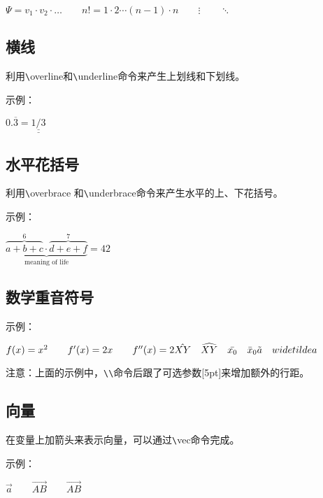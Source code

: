 \documentclass[UTF8]{ctexart}
\begin{document}
$\Psi = v_1 \cdot v_2 \cdot \ldots \qquad n! = 1 \cdot 2 \cdots (n-1) \cdot n
\qquad \vdots \qquad \ddots$
\subsection{横线}
利用\texttt{\textbackslash}overline和\texttt{\textbackslash}underline命令来产生上划线和下划线。

示例：

$0.\overline{3} = \underline{\underline{1/3}}$
\subsection{水平花括号}
利用\texttt{\textbackslash}overbrace 和\texttt{\textbackslash}underbrace命令来产生水平的上、下花括号。

示例：

$\underbrace{\overbrace{a+b+c}^6 \cdot \overbrace{d+e+f}^7}_\text{meaning of life} = 42$
\subsection{数学重音符号}
示例：

$f(x) =x^2 \qquad f'(x) =2x \qquad f''(x) = 2\\[5pt]
\hat{XY} \quad \widehat{XY} \quad \bar{x_0} \quad \bar{x}_0\\[5pt]
\tilde{a} \quad widetilde{a}$

注意：上面的示例中，\texttt{\textbackslash}\texttt{\textbackslash}命令后跟了可选参数[5pt]来增加额外的行距。
\subsection{向量}
在变量上加箭头来表示向量，可以通过\texttt{\textbackslash}vec命令完成。

示例：

$\vec{a} \qquad \vec{AB} \qquad \overrightarrow{AB}$
\end{document}
